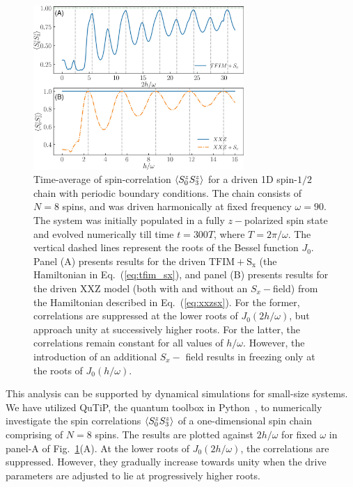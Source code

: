 \documentclass[%
reprint,
superscriptaddress,
amsmath,amssymb,
aps,
prb,
showkeys,
]{revtex4-2}
\begin{document}
\begin{figure}[t!]
	\centering
	\includegraphics[width =8cm]{figure_1.jpeg}
	\caption{Time-average of spin-correlation $\expval{S^z_0 S^z_3}$ for a driven 1D spin-$1/2$ chain with periodic boundary conditions. The chain consists of $N=8$ spins, and was driven harmonically at fixed frequency $\omega=90$.  The system was initially populated in a fully $z-$polarized spin state and evolved numerically till time $t=300T$, where $T=2\pi/\omega$.  The vertical dashed lines represent the roots of the Bessel function $J_0$.  Panel (A) presents results for  the driven $\mathrm{TFIM+S_x}$ (the  Hamiltonian in Eq.~(\ref{eq:tfim_sx}), and panel (B) presents results for the driven  $\mathrm{XXZ}$ model (both with and without an $S_x-$field) from the Hamiltonian described in  Eq.~(\ref{eq:xxzsx}).
	For the former, correlations are suppressed at the lower roots of $J_0\left(2h/\omega\right)$, but approach unity at successively higher roots. For the latter, the correlations remain constant for all values of $h/\omega$. However, the introduction of an additional $S_x-$ field results in freezing only at the roots of $J_0\left(h/\omega\right)$.}
	\label{fig:ipr:tfimsx}
\end{figure}
This analysis can be supported by dynamical simulations for small-size systems. We have utilized QuTiP, the quantum toolbox in Python~\cite{qutip}, to numerically investigate the spin correlations $\expval{S^z_0 S^z_3}$ of a one-dimensional spin chain comprising of $N=8$ spins. The results are plotted against $2h/\omega$ for fixed $\omega$ in panel-A of  Fig.~\ref{fig:ipr:tfimsx}(A). At the lower roots of $J_0\left(2h/\omega\right)$,  the correlations are suppressed. However,  they  gradually increase towards unity when the drive parameters are adjusted to lie at progressively higher roots.
\end{document}
